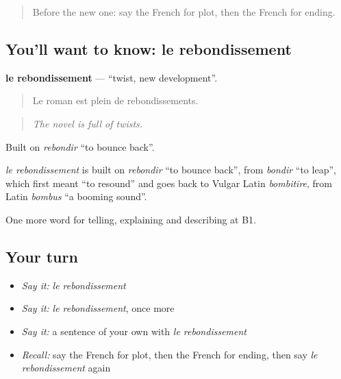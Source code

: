 \begin{quote}
Before the new one: say the French for plot, then the French for ending.
\end{quote}

\subsection*{You'll want to know: le rebondissement}
\textbf{le rebondissement} — \textquotedblleft{}twist, new development\textquotedblright{}.

\begin{quote}
Le roman est plein de rebondissements.
\end{quote}

\begin{quote}
\emph{The novel is full of twists.}
\end{quote}

Built on \emph{rebondir} \textquotedblleft{}to bounce back\textquotedblright{}.

\begin{cousinweb}
\emph{le rebondissement} is built on \emph{rebondir} \textquotedblleft{}to bounce back\textquotedblright{}, from \emph{bondir} \textquotedblleft{}to leap\textquotedblright{}, which first meant \textquotedblleft{}to resound\textquotedblright{} and goes back to Vulgar Latin \emph{bombitīre}, from Latin \emph{bombus} \textquotedblleft{}a booming sound\textquotedblright{}.
\end{cousinweb}

\begin{grammarlens}[title={What you've built}]
One more word for telling, explaining and describing at B1.
\end{grammarlens}

\subsection*{Your turn}
\begin{itemize}
\raggedright
  \item \emph{Say it:} \emph{le rebondissement}
  \item \emph{Say it:} \emph{le rebondissement}, once more
  \item \emph{Say it:} a sentence of your own with \emph{le rebondissement}
  \item \emph{Recall:} say the French for plot, then the French for ending, then say \emph{le rebondissement} again
\end{itemize}

